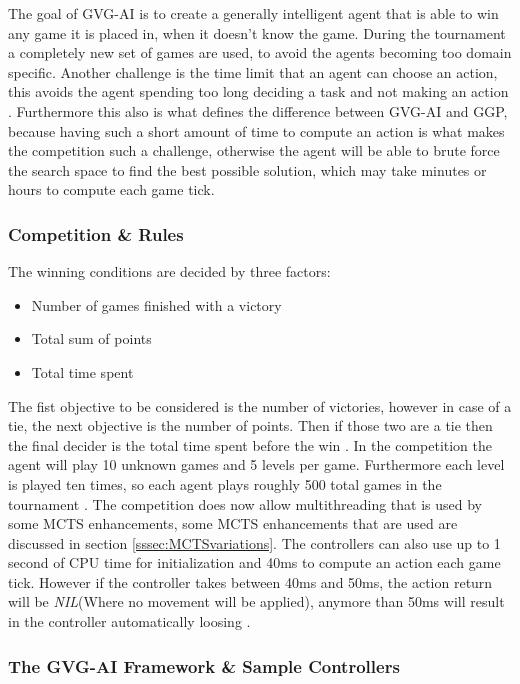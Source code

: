 \documentclass[journal]{IEEEtran}
\begin{document}
		The goal of GVG-AI is to create a generally intelligent agent that is able to win any game it is placed in, when it doesn't know the game.
		During the tournament a completely new set of games are used, to avoid the agents becoming too domain specific.
		Another challenge is the time limit that an agent can choose an action, this avoids the agent spending too long deciding a task and not making an action \cite{schuster2015mcts}. 
		Furthermore this also is what defines the difference between GVG-AI and GGP, because having such a short amount of time to compute an action is what makes the competition such a challenge, otherwise the agent will be able to brute force the search space to find the best possible solution, which may take minutes or hours to compute each game tick.
		
		
	\subsubsection{Competition \& Rules}
	
		The winning conditions are decided by three factors:
		\begin{itemize}
		    \item Number of games finished with a victory
		    \item Total sum of points
		    \item Total time spent
		\end{itemize}
		The fist objective to be considered is the number of victories, however in case of a tie, the next objective is the number of points. Then if those two are a tie then the final decider is the total time spent before the win \cite{perez20162014}.
		In the competition the agent will play 10 unknown games and 5 levels per game. Furthermore each level is played ten times, so each agent plays roughly 500 total games in the tournament \cite{schuster2015mcts}.
		The competition does now allow multithreading that is used by some MCTS enhancements, some MCTS enhancements that are used are discussed in section \ref{sssec:MCTSvariations}.
		The controllers can also use up to 1 second of CPU time for initialization and 40ms to compute an action each game tick. However if the controller takes between 40ms and 50ms, the action return will be \textit{NIL}(Where no movement will be applied), anymore than 50ms will result in the controller automatically loosing \cite{horn2016mcts, perez20162014}.
	
	
	\subsubsection{The GVG-AI Framework \& Sample Controllers} \label{Framework}
	
\end{document}
